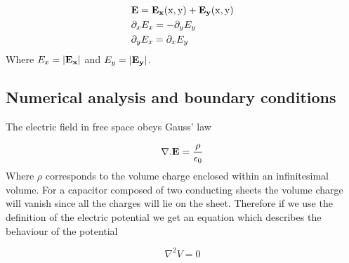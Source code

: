 \documentclass[10 pt]{article}
\numberwithin{equation}{section}
\begin{document}
\begin{multicols}{2}
\begin{equation}
\begin{split}
&\bf E \rm = \bf E_x \rm (x,y) + \bf E_y \rm (x,y)\\
&\partial_x E_x = - \partial_y E_y\\
&\partial_y E_x = \partial_x E_y
\end{split}
\end{equation}
Where $E_x = | \bf E_x \rm |$ and $E_y = | \bf E_y \rm |$.

\subsection{Numerical analysis and boundary conditions}

The electric field in free space obeys Gauss' law \cite{GOGO}

\begin{equation}
\bf \nabla . E \rm = \frac{\rho}{\epsilon_0}
\end{equation}
Where $\rho$ corresponds to the volume charge enclosed within an infinitesimal volume. For a capacitor composed of two conducting sheets the volume charge will vanish since all the charges will lie on the sheet. Therefore if we use the definition of the electric potential we get an equation which describes the behaviour of the potential 

\begin{equation}
\nabla^2 V = 0
\end{equation}


\end{multicols}
\end{document}
